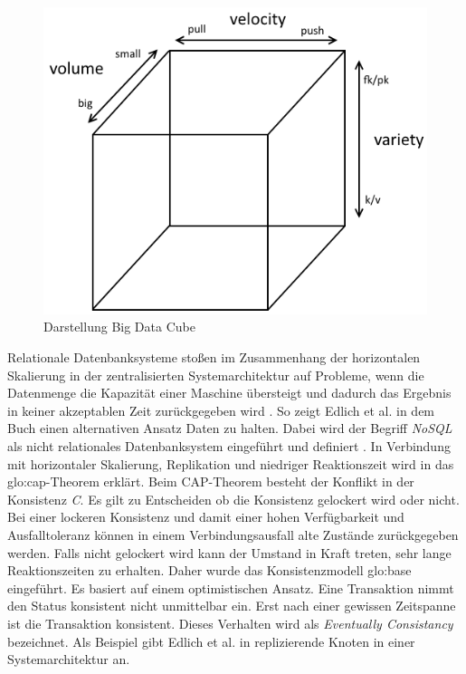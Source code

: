 \begin{figure}[htb!]
\centering
\includegraphics[width=1.0\textwidth]{bilder/bigdatacube.png}
\caption{Darstellung Big Data Cube
\label{fig:bigdatacube}}
\end{figure}

Relationale Datenbanksysteme stoßen im Zusammenhang der horizontalen Skalierung in der zentralisierten Systemarchitektur auf Probleme, wenn die Datenmenge die Kapazität einer Maschine übersteigt und dadurch das Ergebnis in keiner akzeptablen Zeit zurückgegeben wird . So zeigt Edlich et al. in dem Buch  einen alternativen Ansatz Daten zu halten. Dabei wird der Begriff \textit{NoSQL} als nicht relationales Datenbanksystem eingeführt und definiert . In Verbindung mit horizontaler Skalierung, Replikation und niedriger Reaktionszeit wird in  das \gls{glo:cap}-Theorem erklärt. Beim CAP-Theorem besteht der Konflikt in der Konsistenz \textit{C}. Es gilt zu Entscheiden ob die Konsistenz gelockert wird oder nicht. Bei einer lockeren Konsistenz und damit einer hohen Verfügbarkeit und Ausfalltoleranz können in einem Verbindungsausfall alte Zustände zurückgegeben werden. Falls nicht gelockert wird kann der Umstand in Kraft treten, sehr lange Reaktionszeiten zu erhalten. %
Daher wurde das Konsistenzmodell \gls{glo:base} eingeführt. Es basiert auf einem optimistischen Ansatz. Eine Transaktion nimmt den Status konsistent nicht unmittelbar ein. Erst nach einer gewissen Zeitspanne ist die Transaktion konsistent. Dieses Verhalten wird als \textit{Eventually Consistancy} bezeichnet. Als Beispiel gibt Edlich et al. in  replizierende Knoten in einer Systemarchitektur an. 

